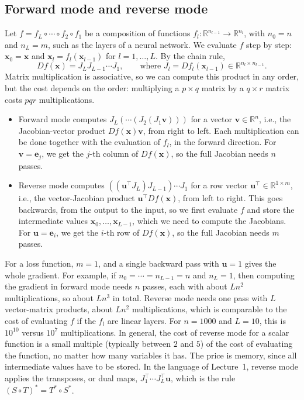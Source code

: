 \documentclass[11pt]{article}
\theoremstyle{definition}
\theoremstyle{plain}
\theoremstyle{remark}
\begin{document}
\subsection{Forward mode and reverse mode}

Let $f = f_L \circ \cdots \circ f_2 \circ f_1$ be a composition of functions $f_l: \mathbb{R}^{n_{l-1}} \to \mathbb{R}^{n_l}$, with $n_0 = n$ and $n_L = m$, such as the layers of a neural network. We evaluate $f$ step by step: $\mathbf{x}_0 = \mathbf{x}$ and $\mathbf{x}_l = f_l(\mathbf{x}_{l-1})$ for $l = 1, \ldots, L$. By the chain rule,
\[Df(\mathbf{x}) = J_L J_{L-1} \cdots J_1, \qquad \text{where } J_l = Df_l(\mathbf{x}_{l-1}) \in \mathbb{R}^{n_l \times n_{l-1}}.\]
Matrix multiplication is associative, so we can compute this product in any order, but the cost depends on the order: multiplying a $p \times q$ matrix by a $q \times r$ matrix costs $pqr$ multiplications.
\begin{itemize}
    \item Forward mode computes $J_L(\cdots(J_2(J_1\mathbf{v})))$ for a vector $\mathbf{v} \in \mathbb{R}^n$, i.e., the Jacobian-vector product $Df(\mathbf{x})\mathbf{v}$, from right to left. Each multiplication can be done together with the evaluation of $f_l$, in the forward direction. For $\mathbf{v} = \mathbf{e}_j$, we get the $j$-th column of $Df(\mathbf{x})$, so the full Jacobian needs $n$ passes.
    \item Reverse mode computes $((\mathbf{u}^\top J_L) J_{L-1}) \cdots J_1$ for a row vector $\mathbf{u}^\top \in \mathbb{R}^{1 \times m}$, i.e., the vector-Jacobian product $\mathbf{u}^\top Df(\mathbf{x})$, from left to right. This goes backwards, from the output to the input, so we first evaluate $f$ and store the intermediate values $\mathbf{x}_0, \ldots, \mathbf{x}_{L-1}$, which we need to compute the Jacobians. For $\mathbf{u} = \mathbf{e}_i$, we get the $i$-th row of $Df(\mathbf{x})$, so the full Jacobian needs $m$ passes.
\end{itemize}
For a loss function, $m = 1$, and a single backward pass with $\mathbf{u} = 1$ gives the whole gradient. For example, if $n_0 = \cdots = n_{L-1} = n$ and $n_L = 1$, then computing the gradient in forward mode needs $n$ passes, each with about $Ln^2$ multiplications, so about $Ln^3$ in total. Reverse mode needs one pass with $L$ vector-matrix products, about $Ln^2$ multiplications, which is comparable to the cost of evaluating $f$ if the $f_l$ are linear layers. For $n = 1000$ and $L = 10$, this is $10^{10}$ versus $10^7$ multiplications. In general, the cost of reverse mode for a scalar function is a small multiple (typically between $2$ and $5$) of the cost of evaluating the function, no matter how many variables it has. The price is memory, since all intermediate values have to be stored. In the language of Lecture~1, reverse mode applies the transposes, or dual maps, $J_1^\top \cdots J_L^\top \mathbf{u}$, which is the rule $(S \circ T)^* = T^* \circ S^*$.
\end{document}

